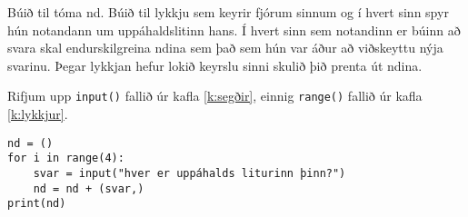 \begin{exercise}\label{nd4}
Búið til tóma nd.
Búið til lykkju sem keyrir fjórum sinnum og í hvert sinn spyr hún notandann um uppáhaldslitinn hans.
Í hvert sinn sem notandinn er búinn að svara skal endurskilgreina ndina sem það sem hún var áður að viðskeyttu nýja svarinu.
Þegar lykkjan hefur lokið keyrslu sinni skulið þið prenta út ndina.
\end{exercise}
\begin{Answer}[ref={nd4}]
Rifjum upp  \texttt{input()} fallið úr kafla \ref{k:segðir}, einnig \texttt{range()} fallið úr kafla \ref{k:lykkjur}.
\begin{lstlisting}
nd = ()
for i in range(4):
	svar = input("hver er uppáhalds liturinn þinn?")
	nd = nd + (svar,)
print(nd)\end{lstlisting}
\end{Answer}